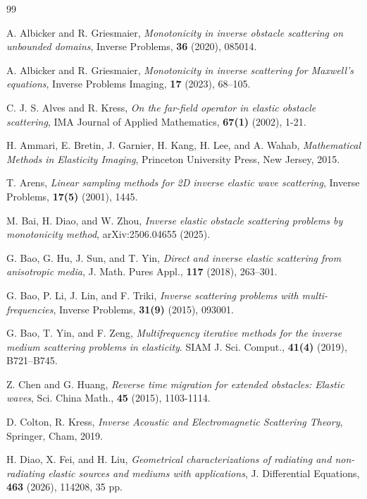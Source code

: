 \documentclass[11pt,reqno,twoside]{amsart}
\theoremstyle{definition}
\theoremstyle{remark}
\numberwithin{equation}{section}
\begin{document}
\begin{thebibliography}{99}


A. Albicker and R. Griesmaier, {\it Monotonicity in inverse obstacle scattering on unbounded domains}, Inverse Problems, \textbf{36} (2020), 085014.

A. Albicker and R. Griesmaier, {\it Monotonicity in inverse scattering for Maxwell’s equations}, Inverse Problems Imaging, \textbf{17} (2023), 68–105.

C. J. S. Alves and R. Kress, {\it On the far-field operator in elastic obstacle scattering}, IMA Journal of Applied Mathematics, \textbf{67(1)} (2002), 1-21.

H. Ammari, E. Bretin, J. Garnier, H. Kang, H. Lee, and A. Wahab, {\it Mathematical Methods in Elasticity Imaging}, Princeton University Press, New Jersey, 2015.

T. Arens, {\it Linear sampling methods for 2D inverse elastic wave scattering}, Inverse Problems, \textbf{17(5)} (2001), 1445.

M. Bai, H. Diao, and W. Zhou, {\it Inverse elastic obstacle scattering problems by monotonicity method}, arXiv:2506.04655 (2025).

G. Bao, G. Hu, J. Sun, and T. Yin, {\it Direct and inverse elastic scattering from anisotropic media}, J. Math. Pures Appl., \textbf{117} (2018), 263–301.

G. Bao, P. Li, J. Lin, and F. Triki, {\it Inverse scattering problems with multi-frequencies}, Inverse Problems, \textbf{31(9)} (2015), 093001.

G. Bao, T. Yin, and F. Zeng, {\it Multifrequency iterative methods for the inverse medium scattering problems in elasticity}. SIAM J. Sci. Comput., \textbf{41(4)} (2019), B721–B745.

Z. Chen and G. Huang, {\it Reverse time migration for extended obstacles: Elastic waves}, Sci. China Math., \textbf{45} (2015), 1103-1114.

D. Colton, R. Kress, {\it Inverse Acoustic and Electromagnetic Scattering Theory}, Springer, Cham, 2019.

H. Diao, X. Fei, and H. Liu, {\it Geometrical characterizations of radiating and non-radiating elastic sources and mediums with applications}, J. Differential Equations, \textbf{463} (2026), 114208, 35 pp.


\end{thebibliography}
\end{document}
